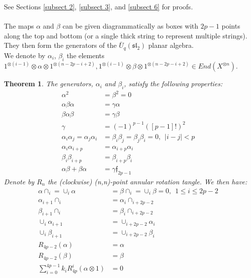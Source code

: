 \documentclass[]{article}
\newtheorem{thm}{Theorem}[section]
\begin{document}
See Sections \ref{subsect 2}, \ref{subsect 3}, and \ref{subsect 6} for proofs.\\
\\
The maps $\alpha$ and $\beta$ can be given diagrammatically as boxes with $2p-1$ points along the top and bottom (or a single thick string to represent multiple strings). They then form the generators of the $\bar{U}_{q}(\mathfrak{sl}_{2})$ planar algebra.\\
We denote by $\alpha_{i}$, $\beta_{i}$ the elements $1^{\otimes (i-1)}\otimes\alpha\otimes 1^{\otimes(n-2p-i+2)},1^{\otimes (i-1)}\otimes\beta\otimes 1^{\otimes(n-2p-i+2)}\in End(X^{\otimes n})$.\\
\begin{thm}\label{thm}
The generators, $\alpha_{i}$ and $\beta_{i}$, satisfy the following properties:
\begin{align}
\alpha^{2}&=\beta^{2}=0 \label{eq:1}\\
 \alpha\beta\alpha&=\gamma\alpha \label{eq:2}\\
 \beta\alpha\beta&=\gamma\beta \label{eq:3}\\
 \gamma&=(-1)^{p-1}([p-1]!)^{2} \nonumber \\
 \alpha_{i}\alpha_{j}=\alpha_{j}\alpha_{i}&=\beta_{i}\beta_{j}=\beta_{j}\beta_{i}=0, \:\: \lvert i-j\rvert< p \label{eq:4}\\
 \alpha_{i}\alpha_{i+p}&=\alpha_{i+p}\alpha_{i} \label{eq:5}\\
 \beta_{i}\beta_{i+p}&=\beta_{i+p}\beta_{i} \label{eq:6}\\
 \alpha\beta+\beta\alpha&=\gamma \mathfrak{f}_{2p-1} \label{eq:7}
 \end{align}
Denote by $R_{n}$ the (clockwise) (n,n)-point annular rotation tangle. We then have:
 \begin{align}
 \alpha\cap_{i}=\cup_{i}\alpha&=\beta\cap_{i}=\cup_{i}\beta=0, \:\: 1\leq i\leq 2p-2 \label{eq:8}\\
 \alpha_{i+1}\cap_{i}&=\alpha_{i}\cap_{i+2p-2} \label{eq:9}\\
  \beta_{i+1}\cap_{i}&=\beta_{i}\cap_{i+2p-2} \label{eq:10}\\
 \cup_{i}\alpha_{i+1}&=\cup_{i+2p-2}\alpha_{i} \label{eq:11}\\
 \cup_{i}\beta_{i+1}&=\cup_{i+2p-2}\beta_{i} \label{eq:12}\\
 R_{4p-2}(\alpha)&=\alpha \label{eq:13}\\
 R_{4p-2}(\beta)&=\beta \label{eq:14}\\
 \sum\limits_{i=0}^{4p-1} k_{i}R^{i}_{4p}(\alpha\otimes 1)&=0 \label{eq:15}\\

\end{align}
\end{thm}
\end{document}
